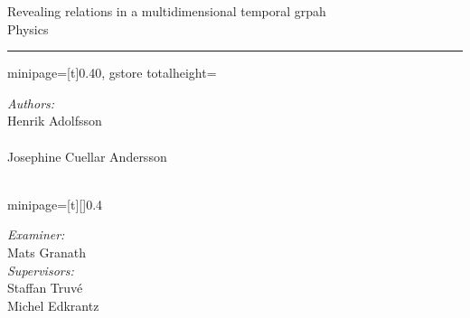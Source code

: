
\begin{center}
	\bigskip
	\bigskip
	\Huge{Revealing relations in a multidimensional temporal grpah}\\
	\bigskip
	\Large{Physics}
\end{center}

\bigskip
\bigskip
\noindent\rule{\linewidth}{0.4pt}
\bigskip

\newlength\myheight
\begin{center}
	\begin{adjustbox}{%
		minipage=[t]{0.40\linewidth},
		gstore totalheight=\myheight
	}
		\begin{flushleft}
			\large \emph{Authors:}\\
			Henrik Adolfsson\\
			\\[0.3cm]
			Josephine Cuellar Andersson\\
			\\[0.3cm] 
		\end{flushleft}
	\end{adjustbox}
	\hspace{0.5cm}
	\begin{adjustbox}{minipage=[t][\myheight]{0.4\linewidth}}
		\begin{flushright} \large
			\emph{Examiner:} \\
			Mats Granath\\ [0.3cm]

			\emph{Supervisors:} \\
			Staffan Truv\'e\\
			Michel Edkrantz\\
		\end{flushright}
	\end{adjustbox}
\end{center}

\vspace*{\fill}

\begin{center}
	\Large{%
		\whereandwhen
	}
\end{center}


\thispagestyle{empty}
\newpage
